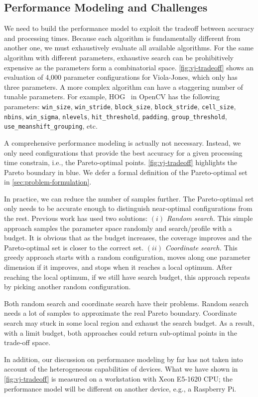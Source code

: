 
\subsection{Performance Modeling and Challenges}
\label{sec:perf-model-chall}

We need to build the performance model to exploit the tradeoff between accuracy
and processing times. Because each algorithm is fundamentally different from
another one, we must exhaustively evaluate all available algorithms. For the
same algorithm with different parameters, exhaustive search can be prohibitively
expensive as the parameters form a combinatorial
space. \autoref{fig:vj-tradeoff} shows an evaluation of 4,000 parameter
configurations for Viola-Jones, which only has three parameters. A more complex
algorithm can have a staggering number of tunable parameters. For example,
HOG~\cite{dalal2005histograms} in OpenCV has the following parameters:
\texttt{win\_size}, \texttt{win\_stride}, \texttt{block\_size},
\texttt{block\_stride}, \texttt{cell\_size}, \texttt{nbins},
\texttt{win\_sigma}, \texttt{nlevels}, \texttt{hit\_threshold},
\texttt{padding}, \texttt{group\_threshold}, \texttt{use\_meanshift\_grouping},
etc.

A comprehensive performance modeling is actually not necessary. Instead, we only
need configurations that provide the best accuracy for a given processing time
constrain, i.e., the Pareto-optimal points. \autoref{fig:vj-tradeoff} highlights
the Pareto boundary in blue. We defer a formal definition of the Pareto-optimal
set in \autoref{sec:problem-formulation}.

In practice, we can reduce the number of samples further. The Pareto-optimal set
only needs to be accurate enough to distinguish near-optimal configurations from
the rest. Previous work has used two solutions: $(i)$ \textit{Random search.}
This simple approach samples the parameter space randomly and search/profile
with a budget. It is obvious that as the budget increases, the coverage improves
and the Pareto-optimal set is closer to the correct set. $(ii)$
\textit{Coordinate search.} This greedy approach starts with a random
configuration, moves along one parameter dimension if it improves, and stops
when it reaches a local optimum. After reaching the local optimum, if we still
have search budget, this approach repeats by picking another random
configuration.

Both random search and coordinate search have their problems. Random search
needs a lot of samples to approximate the real Pareto boundary. Coordinate
search may stuck in some local region and exhaust the search budget. As a
result, with a limit budget, both approaches could return sub-optimal points in
the trade-off space.

In addition, our discussion on performance modeling by far has not taken into
account of the heterogeneous capabilities of devices. What we have shown in
\autoref{fig:vj-tradeoff} is measured on a workstation with Xeon E5-1620 CPU;
the performance model will be different on another device, e.g., a Raspberry Pi.


